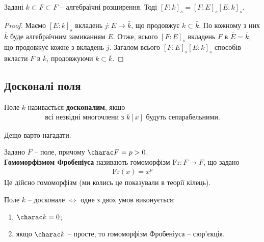 \documentclass{math_library}
\begin{document}
\begin{proposition}
Задані $k \subset F \subset F$ -- алгебраїчні розширення. Тоді $[F:k]_s = [F:E]_s [E:k]_s$.
\end{proposition}

\begin{proof}
Маємо $[E:k]_s$ вкладень $j \colon E \to \bar{k}$, що продовжує $k \subset \bar{k}$. По кожному з них $\bar{k}$ буде алгебраїчним замиканням $E$. Отже, всього $[F:E]_s$ вкладень $F$ в $\bar{E} = \bar{k}$, що продовжує кожне з вкладень $j$. Загалом всього $[F:E]_s [E:k]_s$ способів вкласти $F$ в $\bar{k}$, продовжуючи $k \subset \bar{k}$.
\end{proof}

\subsection{Досконалі поля}
\begin{definition}
Поле $k$ називається \textbf{досконалим}, якщо
\begin{align*}
\text{всі незвідні многочлени з $k[x]$ будуть сепарабельними.}
\end{align*}
\end{definition}

Дещо варто нагадати.
\begin{definition}
Задано $F$ -- поле, причому $\charac F = p > 0$.\\
\textbf{Гомоморфізмом Фробеніуса} називають гомоморфізм $\text{Fr} \colon F \to F$, що задано
\begin{align*}
\text{Fr}(x) = x^p
\end{align*}
Це дійсно гомоморфізм (ми колись це показували в теорії кілець).
\end{definition}

\begin{proposition}
Поле $k$ -- досконале $\iff$ одне з двох умов виконується:
\begin{enumerate}[nosep,wide=0pt,label={\arabic*)}]
\item $\charac k = 0$;
\item якщо $\charac k $ -- просте, то гомоморфізм Фробеніуса -- сюр'єкція. 
\end{enumerate} 
\end{proposition}
\end{document}
